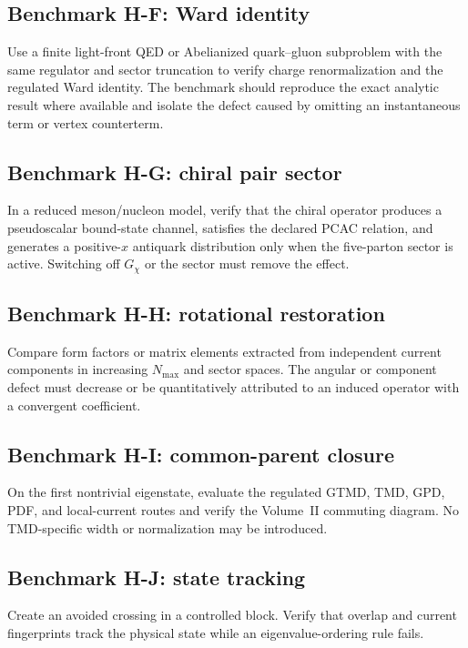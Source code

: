 \documentclass[11pt]{article}
\begin{document}
\subsection{Benchmark H-F: Ward identity}

Use a finite light-front QED or Abelianized quark--gluon subproblem with the
same regulator and sector truncation to verify charge renormalization and the
regulated Ward identity.  The benchmark should reproduce the exact analytic
result where available and isolate the defect caused by omitting an
instantaneous term or vertex counterterm.

\subsection{Benchmark H-G: chiral pair sector}

In a reduced meson/nucleon model, verify that the chiral operator produces a
pseudoscalar bound-state channel, satisfies the declared PCAC relation, and
generates a positive-\(x\) antiquark distribution only when the five-parton
sector is active.  Switching off \(G_\chi\) or the sector must remove the effect.

\subsection{Benchmark H-H: rotational restoration}

Compare form factors or matrix elements extracted from independent current
components in increasing \(N_{\max}\) and sector spaces.  The angular or
component defect must decrease or be quantitatively attributed to an induced
operator with a convergent coefficient.

\subsection{Benchmark H-I: common-parent closure}

On the first nontrivial eigenstate, evaluate the regulated GTMD, TMD, GPD, PDF,
and local-current routes and verify the Volume~II commuting diagram.  No
TMD-specific width or normalization may be introduced.

\subsection{Benchmark H-J: state tracking}

Create an avoided crossing in a controlled block.  Verify that overlap and
current fingerprints track the physical state while an eigenvalue-ordering
rule fails.
\end{document}
